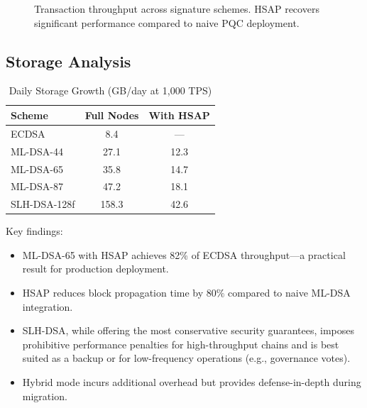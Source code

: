 \documentclass[12pt, a4paper, twocolumn]{article}
\begin{document}
\begin{figure}[H]
\centering
{}
\caption{Transaction throughput across signature schemes. HSAP recovers significant performance compared to naive PQC deployment.}
\label{fig:throughput}
\end{figure}

\subsection{Storage Analysis}

\begin{table}[H]
\centering
\caption{Daily Storage Growth (GB/day at 1,000 TPS)}
\label{tab:storage}
\begin{tabular}{lcc}
\toprule
\textbf{Scheme} & \textbf{Full Nodes} & \textbf{With HSAP} \\
\midrule
ECDSA                & 8.4  & --- \\
ML-DSA-44            & 27.1 & 12.3 \\
ML-DSA-65            & 35.8 & 14.7 \\
ML-DSA-87            & 47.2 & 18.1 \\
SLH-DSA-128f         & 158.3 & 42.6 \\
\bottomrule
\end{tabular}
\end{table}

Key findings:

\begin{itemize}[noitemsep]
  \item ML-DSA-65 with HSAP achieves 82\% of ECDSA throughput---a practical result for production deployment.
  \item HSAP reduces block propagation time by $80\%$ compared to naive ML-DSA integration.
  \item SLH-DSA, while offering the most conservative security guarantees, imposes prohibitive performance penalties for high-throughput chains and is best suited as a backup or for low-frequency operations (e.g., governance votes).
  \item Hybrid mode incurs additional overhead but provides defense-in-depth during migration.
\end{itemize}
\end{document}
